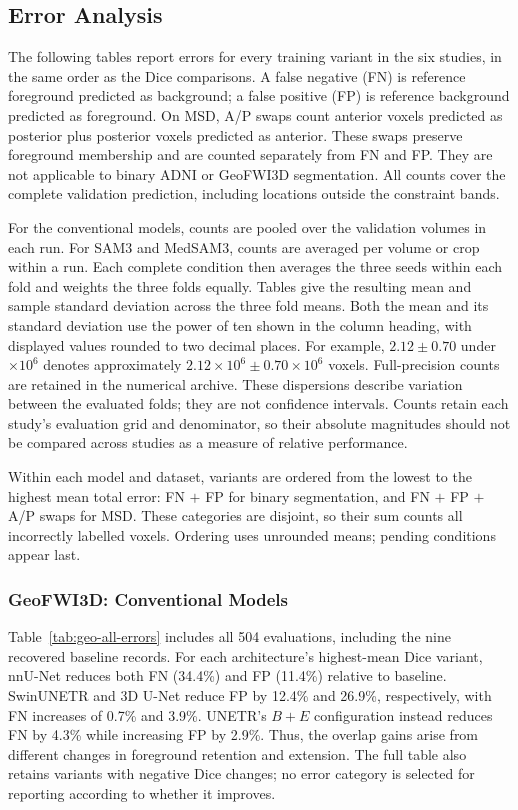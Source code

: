 \subsection{Error Analysis}
\label{sec:error-analysis}
\label{sec:capped-errors-resources}

The following tables report errors for every training variant in the
six studies, in the same order as the Dice comparisons. A false negative
(FN) is reference foreground predicted as background; a false positive
(FP) is reference background predicted as foreground. On MSD, A/P swaps
count anterior voxels predicted as posterior plus posterior voxels
predicted as anterior. These swaps preserve foreground membership and
are counted separately from FN and FP. They are not applicable
to binary ADNI or GeoFWI3D segmentation. All counts cover the complete
validation prediction, including locations outside the constraint bands.

For the conventional models, counts are pooled over the validation
volumes in each run. For SAM3 and MedSAM3, counts are averaged per volume
or crop within a run. Each complete condition then averages the three
seeds within each fold and weights the three folds equally. Tables give
the resulting mean and sample standard deviation across the three fold
means. Both the mean and its standard deviation use the power of ten
shown in the column heading, with displayed values rounded to two decimal
places. For example, $2.12\pm0.70$ under $\times10^6$ denotes
approximately $2.12\times10^6\pm0.70\times10^6$ voxels. Full-precision
counts are retained in the numerical archive.
These dispersions describe variation between the evaluated folds;
they are not confidence intervals. Counts retain each study's evaluation
grid and denominator, so their absolute magnitudes should not be compared
across studies as a measure of relative performance.

Within each model and dataset, variants are ordered from the lowest to
the highest mean total error: FN $+$ FP for binary segmentation, and
FN $+$ FP $+$ A/P swaps for MSD. These categories are disjoint, so their
sum counts all incorrectly labelled voxels. Ordering uses unrounded
means; pending conditions appear last.

\subsubsection{GeoFWI3D: Conventional Models}

Table~\ref{tab:geo-all-errors} includes all 504 evaluations, including
the nine recovered baseline records. For each architecture's highest-mean
Dice variant, nnU-Net reduces both FN (34.4\%) and FP (11.4\%) relative
to baseline. SwinUNETR and 3D U-Net reduce FP by 12.4\% and 26.9\%,
respectively, with FN increases of 0.7\% and 3.9\%. UNETR's $B+E$
configuration instead reduces FN by 4.3\% while increasing FP by 2.9\%.
Thus, the overlap gains arise from different changes in foreground
retention and extension. The full table also retains variants with
negative Dice changes; no error category is selected for reporting
according to whether it improves.

